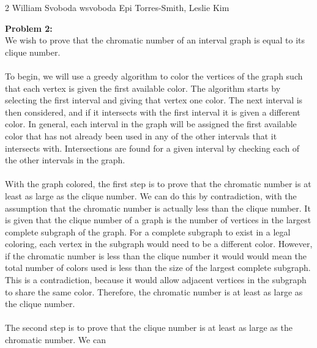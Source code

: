 \documentclass[12pt,letterpaper]{cos340hw}
\begin{document}
           {2}            %
           {William Svoboda}  %
           {wsvoboda}   %
           {Epi Torres-Smith, Leslie Kim} 




\noindent\textbf{Problem 2:}\\
We wish to prove that the chromatic number of an interval graph is equal to its clique number.\\\\
To begin, we will use a greedy algorithm to color the vertices of the graph such that each vertex is given 
the first available color. The algorithm starts by selecting the first interval and giving that vertex one color. 
The next interval is then considered, and if it intersects with the first interval it is given a different color. 
In general, each interval in the graph will be assigned the first available color that has not already been 
used in any of the other intervals that it intersects with. Intersections are found for a given interval by checking 
each of the other intervals in the graph.\\\\
With the graph colored, the first step is to prove that the chromatic number is at least as large as the clique 
number. We can do this by contradiction, with the assumption that the chromatic number is actually less 
than the clique number. It is given that the clique number of a graph is the number of vertices in the 
largest complete subgraph of the graph. For a complete subgraph to exist in a legal coloring, each vertex 
in the subgraph would need to be a different color. However, if the chromatic number is less than the 
clique number it would would mean the total number of colors used is less than the size of the largest complete 
subgraph. This is a contradiction, because it would allow adjacent vertices in the subgraph to share the same 
color. Therefore, the chromatic number is at least as large as the clique number.\\\\
The second step is to prove that the clique number is at least as large as the chromatic number. We can 
\end{document}
